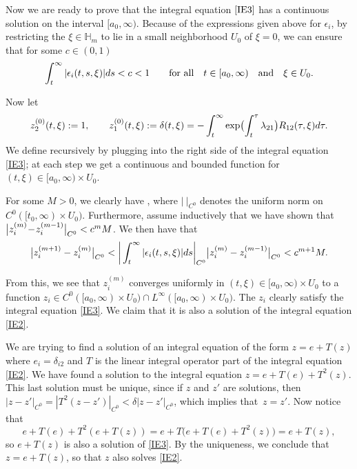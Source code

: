 \documentclass[11pt]{article}
\numberwithin{equation}{section}
\numberwithin{equation}{section}
\begin{document}
Now we are ready to prove that the integral equation $\eqref{IE3}$ has a continuous solution on the interval $[a_0,\infty)$. Because of the expressions given above for $\epsilon_i$, by restricting the $\xi \in \mathbb{H}_m$ to lie in a small neighborhood $U_{0}$ of $\xi=0$, we can ensure that for some $c\in (0,1)$
\begin{equation*}
 \int_{t}^{\infty}|\epsilon_i(t,s,\xi)|{\rm d}s<c<1 \qquad \text{for all} \quad t\in [a_0,\infty) \quad \text{and} \quad \xi \in U_{0}.
\end{equation*}

Now let
\[
z^{(0)}_2(t,\xi):=1 , \qquad z^{(0)}_1(t,\xi):=\delta(t,\xi)= -\int_{t}^{\infty}\exp \bigl(\int_{t}^{\tau}\lambda_{21}\bigr)R_{12}(\tau,\xi){\rm d}\tau.
\]
 We define  recursively by plugging  into the right side of the integral equation \eqref{IE3}; at each step we get a continuous and bounded function for $(t,\xi) \in [a_0,\infty)\times U_{0}$.

For some $M>0$, we clearly have , where $|\ |_{C^0}$ denotes the uniform norm on~${C^0([t_0,\infty)\times U_{0})}$. Furthermore, assume inductively that we have shown that $\smash{\big|z^{(m)}_i \!-\! z^{(m-1)}_i\big|_{C^0}}\allowbreak<c^m M$. We then have that
\begin{equation*}
 \big|z^{(m+1)}_i - z^{(m)}_i\big|_{C^0}< \bigg|\int_{t}^{\infty}|\epsilon_i(t,s,\xi)|{\rm d}s\bigg|_{C^0}\big|z^{(m)}_i - z^{(m-1)}_i\big|_{C^0}<c^{m+1}M.
\end{equation*}

From this, we see that $z_i^{(m)}$ converges uniformly in $(t,\xi)\in [a_0,\infty)\times U_{0}$ to a function $z_i \in C^0([a_0,\infty)\times U_{0})\cap L^{\infty}([a_0,\infty)\times U_{0})$. The $z_i$ clearly satisfy the integral equation \eqref{IE3}. We claim that it is also a solution of the integral equation \eqref{IE2}.

We are trying to find a solution of an integral equation of the form
$
 z= e + T(z)
$
where $e_i=\delta_{i2}$ and $T$ is the linear integral operator part of the integral equation \eqref{IE2}. We have found a solution to the integral equation $z=e+T(e)+T^2(z)$. This last solution must be unique, since if $z$ and $z'$ are solutions, then $|z-z'|_{C^0}=|T^2(z-z')|_{C^0}<\delta |z-z'|_{C^0}$, which implies that~${z=z'}$. Now notice that
\begin{equation*}
 e+T(e)+T^2(e+T(z))=e+T\bigl(e+T(e)+T^2(z)\bigr)=e+T(z),
\end{equation*}
so $e+T(z)$ is also a solution of \eqref{IE3}. By the uniqueness, we conclude that $z=e+T(z)$, so that $z$ also solves \eqref{IE2}.
\end{document}
